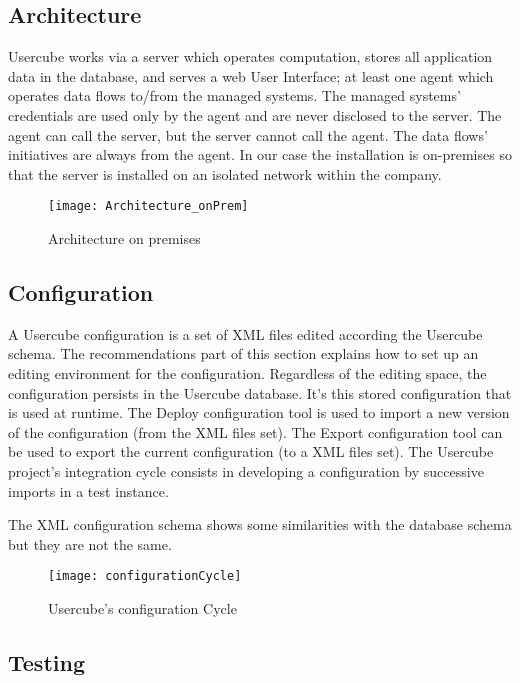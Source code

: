 \subsection{Architecture}
\label{sec:Template}

Usercube works via a server which operates computation, stores all application data in the database, and serves a web User Interface; at least one agent which operates data flows to/from the managed systems. The managed systems' credentials are used only by the agent and are never disclosed to the server. The agent can call the server, but the server cannot call the agent. The data flows' initiatives are always from the agent. In our case the installation is on-premises so that the server is installed on an isolated network within the company.

\begin{figure}[htbp]
  \centering
  \texttt{[image: Architecture\_onPrem]}
  \caption{Architecture on premises}
  \label{fig:Architecture_onPrem}
\end{figure}

\subsection{Configuration}
\label{sec:Template}

A Usercube configuration is a set of XML files edited according the Usercube schema. The recommendations part of this section explains how to set up an editing environment for the configuration. Regardless of the editing space, the configuration persists in the Usercube database. It's this stored configuration that is used at runtime. The Deploy configuration tool is used to import a new version of the configuration (from the XML files set). The Export configuration tool can be used to export the current configuration (to a XML files set). The Usercube project's integration cycle consists in developing a configuration by successive imports in a test instance.

The XML configuration schema shows some similarities with the database schema but they are not the same.

\begin{figure}[htbp]
  \centering
  \texttt{[image: configurationCycle]}
  \caption{Usercube's configuration Cycle}
  \label{fig:configurationCycle}
\end{figure}

\subsection{Testing}
\label{sec:Template}


